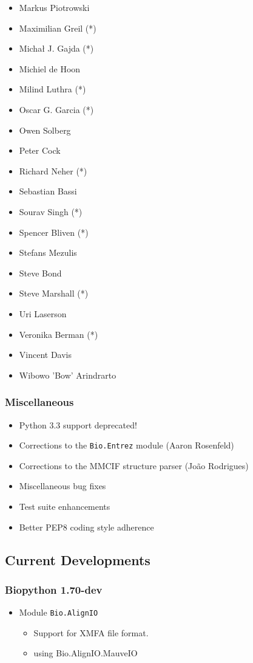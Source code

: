 \documentclass[trans]{beamer}
\begin{document}
{{\begin{multicols}{2}
\begin{itemize}
  \item Markus Piotrowski
  \item Maximilian Greil (*)
  \item Michał J. Gajda (*)
  \item Michiel de Hoon
  \item Milind Luthra (*)
  \item Oscar G. Garcia (*)
  \item Owen Solberg
  \item Peter Cock
  \item Richard Neher (*)
  \item Sebastian Bassi
  \item Sourav Singh (*)
  \item Spencer Bliven (*)
  \item Stefans Mezulis
  \item Steve Bond
  \item Steve Marshall (*)
  \item Uri Laserson
  \item Veronika Berman (*)
  \item Vincent Davis
  \item Wibowo 'Bow' Arindrarto

  \end{itemize}
  \end{multicols}
  }
}


\frame
{
  \frametitle{Miscellaneous}

  \begin{itemize}
  \item Python 3.3 support deprecated!
  \item Corrections to the \texttt{Bio.Entrez} module (Aaron Rosenfeld)
  \item Corrections to the MMCIF structure parser (João Rodrigues)
  \item Miscellaneous bug fixes
  \item Test suite enhancements
  \item Better PEP8 coding style adherence
  \end{itemize}
}


\subsection*{Current Developments}
\frame
{
}


\frame
{
  \frametitle{Biopython 1.70-dev}

  \begin{itemize}
  \item Module \texttt{Bio.AlignIO}
  \begin{itemize}
  \item Support for XMFA file format.
  \item using Bio.AlignIO.MauveIO
  \end{itemize}
  \end{itemize}

}
\end{document}
